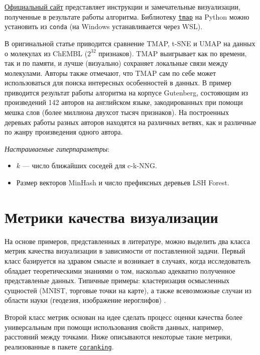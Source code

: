 \documentclass[10pt, a4paper]{extarticle}
\newcommand{\code}[1]{\texttt{#1}}
\begin{document}
\href{http://tmap.gdb.tools/}{Официальный сайт} представляет инструкции и замечательные визуализации, полученные в результате работы алгоритма. Библиотеку \href{http://tmap.gdb.tools/#installation}{\code{tmap}} на Python можно установить из \code{conda} (на Windows устанавливается через WSL). 

В оригинальной статье приводится сравнение TMAP, t-SNE и UMAP на данных о молекулах из ChEMBL ($2^{32}$ признаков). 
TMAP выигрывает как по времени, так и по памяти, и лучше (визуально) сохраняет локальные связи между молекулами. 
Авторы также отмечают, что TMAP сам по себе может использоваться для поиска интересных особенностей в данных. 
В пример приводится результат работы алгоритма на корпусе Gutenberg, состояющим из произведений 142 авторов на английском языке, закодированных при помощи мешка слов (более миллиона двухсот тысяч признаков). 
На построенных деревьях работы разных авторов находятся на различных ветвях, как и различные по жанру произведения одного автора. 

\textit{Настраиваемые гиперпараметры}:
\begin{itemize}
    \item $k$ — число ближайших соседей для c-k-NNG.
    \item Размер векторов MinHash и число префиксных деревьев LSH Forest.
\end{itemize}


\section{Метрики качества визуализации}

На основе примеров, представленных в литературе, можно выделить два класса метрик качества визуализации в зависимости от поставленной задачи. Первый класс базируется на здравом смысле и возникает в случаях, когда исследователь обладает теоретическими знаниями о том, насколько адекватно полученное представленые данных. Типичные примеры: кластеризация осмысленных сущностей (MNIST, торговые точки на карте), а также всевозможные случаи из области науки (геодезия, изображение иероглифов) \cite{roman2017assessing, balamurali2016t}. 

Второй класс метрик основан на идее сделать процесс оценки качества более универсальным при помощи использования свойств данных, например, расстояний между точками. Ниже описываются некоторые такие метрики, реализованные в пакете \href{https://github.com/samueljackson92/coranking}{\code{coranking}}.
\end{document}
